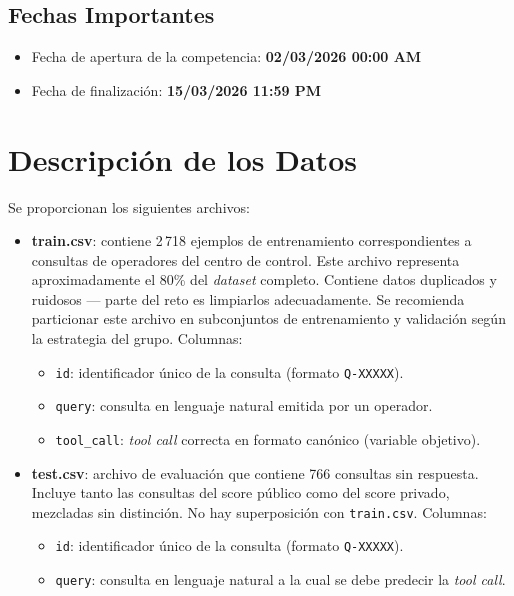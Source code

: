 \documentclass{article}
\begin{document}
\subsection{Fechas Importantes}
\begin{itemize}
    \item Fecha de apertura de la competencia: \textbf{02/03/2026 00:00 AM}
    \item Fecha de finalización: \textbf{15/03/2026 11:59 PM}
\end{itemize}

\section{Descripción de los Datos}
Se proporcionan los siguientes archivos:

\begin{itemize}
    \item \textbf{train.csv}: contiene 2\,718 ejemplos de entrenamiento correspondientes a consultas de operadores del centro de control. Este archivo representa aproximadamente el 80\% del \textit{dataset} completo. Contiene datos duplicados y ruidosos --- parte del reto es limpiarlos adecuadamente. Se recomienda particionar este archivo en subconjuntos de entrenamiento y validación según la estrategia del grupo. Columnas:
    \begin{itemize}
        \item \texttt{id}: identificador único de la consulta (formato \texttt{Q-XXXXX}).
        \item \texttt{query}: consulta en lenguaje natural emitida por un operador.
        \item \texttt{tool\_call}: \textit{tool call} correcta en formato canónico (variable objetivo).
    \end{itemize}

    \item \textbf{test.csv}: archivo de evaluación que contiene 766 consultas sin respuesta. Incluye tanto las consultas del score público como del score privado, mezcladas sin distinción. No hay superposición con \texttt{train.csv}. Columnas:
    \begin{itemize}
        \item \texttt{id}: identificador único de la consulta (formato \texttt{Q-XXXXX}).
        \item \texttt{query}: consulta en lenguaje natural a la cual se debe predecir la \textit{tool call}.
    \end{itemize}


\end{itemize}
\end{document}
